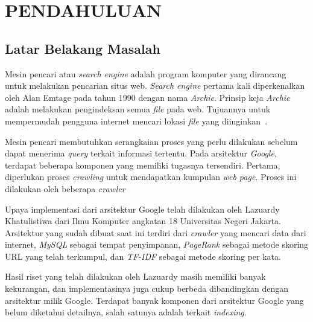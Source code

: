 
\chapter{PENDAHULUAN}

\section{Latar Belakang Masalah}

Mesin pencari atau \emph{search engine} adalah program komputer yang dirancang untuk melakukan pencarian situs web. \emph{Search engine} pertama kali diperkenalkan oleh Alan Emtage pada tahun 1990 dengan nama \emph{Archie}. Prinsip keja \emph{Archie} adalah melakukan pengindeksan semua \emph{file} pada web. Tujuannya untuk mempermudah pengguna internet mencari lokasi \emph{file} yang diinginkan~\cite{seymour2011history}.


Mesin pencari membutuhkan serangkaian proses yang perlu dilakukan sebelum dapat menerima \emph{query} terkait informasi tertentu. Pada arsitektur \emph{Google},   terdapat beberapa komponen yang memiliki tugasnya tersendiri. Pertama, diperlukan proses \emph{crawling} untuk mendapatkan kumpulan \emph{web page}. Proses ini dilakukan oleh beberapa \emph{crawler} 

Upaya implementasi dari arsitektur Google telah dilakukan oleh Lazuardy Khatulistiwa dari Ilmu Komputer angkatan 18 Universitas Negeri Jakarta. Arsitektur yang sudah dibuat saat ini terdiri dari \emph{crawler} yang mencari data dari internet, \emph{MySQL} sebagai tempat penyimpanan, \emph{PageRank} sebagai metode skoring URL yang telah terkumpul, dan \emph{TF-IDF} sebagai metode skoring per kata.

Hasil riset yang telah dilakukan oleh Lazuardy masih memiliki banyak kekurangan, dan implementasinya juga cukup berbeda dibandingkan dengan arsitektur milik Google. Terdapat banyak komponen dari arsitektur Google yang belum diketahui detailnya, salah satunya adalah terkait \emph{indexing}.


